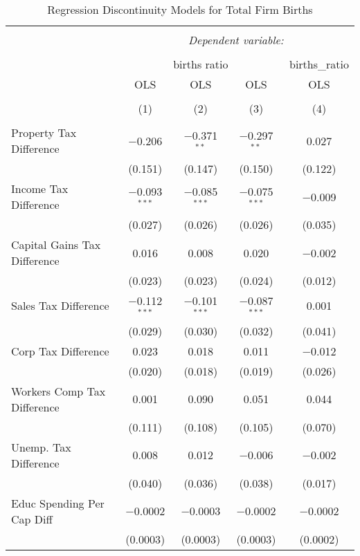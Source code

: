 
\begin{table}[!htbp] \centering 
  \caption{Regression Discontinuity Models for  Total Firm Births} 
  \label{--rd} 
\begin{tabular}{@{\extracolsep{5pt}}lcccc} 
\\[-1.8ex]\hline 
\hline \\[-1.8ex] 
 & \multicolumn{4}{c}{\textit{Dependent variable:}} \\ 
\cline{2-5} 
\\[-1.8ex] & \multicolumn{3}{c}{births ratio} & births\_ratio \\ 
 & OLS & OLS & OLS & OLS \\ 
\\[-1.8ex] & (1) & (2) & (3) & (4)\\ 
\hline \\[-1.8ex] 
 Property Tax Difference & $-$0.206 & $-$0.371$^{**}$ & $-$0.297$^{**}$ & 0.027 \\ 
  & (0.151) & (0.147) & (0.150) & (0.122) \\ 
  Income Tax Difference & $-$0.093$^{***}$ & $-$0.085$^{***}$ & $-$0.075$^{***}$ & $-$0.009 \\ 
  & (0.027) & (0.026) & (0.026) & (0.035) \\ 
  Capital Gains Tax Difference & 0.016 & 0.008 & 0.020 & $-$0.002 \\ 
  & (0.023) & (0.023) & (0.024) & (0.012) \\ 
  Sales Tax Difference & $-$0.112$^{***}$ & $-$0.101$^{***}$ & $-$0.087$^{***}$ & 0.001 \\ 
  & (0.029) & (0.030) & (0.032) & (0.041) \\ 
  Corp Tax Difference & 0.023 & 0.018 & 0.011 & $-$0.012 \\ 
  & (0.020) & (0.018) & (0.019) & (0.026) \\ 
  Workers Comp Tax Difference & 0.001 & 0.090 & 0.051 & 0.044 \\ 
  & (0.111) & (0.108) & (0.105) & (0.070) \\ 
  Unemp. Tax Difference & 0.008 & 0.012 & $-$0.006 & $-$0.002 \\ 
  & (0.040) & (0.036) & (0.038) & (0.017) \\ 
  Educ Spending Per Cap Diff & $-$0.0002 & $-$0.0003 & $-$0.0002 & $-$0.0002 \\ 
  & (0.0003) & (0.0003) & (0.0003) & (0.0002) \\ 

\end{tabular}
\end{table}
